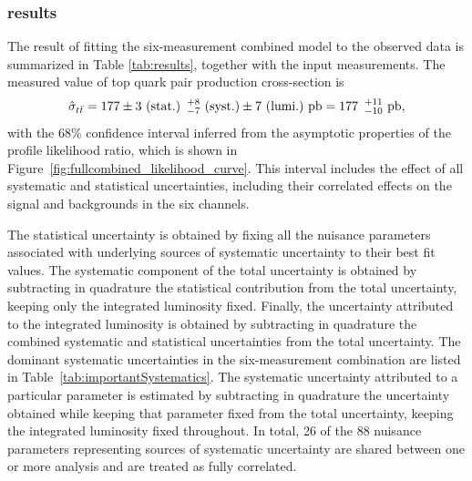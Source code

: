 

\subsubsection{results}
\label{sec:results}

The result of fitting the six-measurement combined model to the observed data is summarized in Table \ref{tab:results}, 
together with the input measurements.
The measured value of top quark pair production cross-section is
\begin{equation}
\hat\sigma_{t\bar{t}} =  177 \pm 3~\textrm{(stat.)} \hspace{ 5 pt } {}^{+8}_{-7}~\textrm{(syst.)} \pm 7~\textrm{(lumi.)}~\textrm{pb} = 177 \hspace{ 5 pt } {}^{+11}_{-10}~\textrm{pb}, \nonumber
\end{equation}
with the 68\% confidence interval inferred from the asymptotic properties of the profile likelihood ratio, which is shown in Figure~\ref{fig:fullcombined_likelihood_curve}.  
This interval includes the effect of all systematic and statistical uncertainties, including their correlated effects on the signal and backgrounds in the six channels.  

The statistical uncertainty is obtained by fixing all the nuisance parameters associated with underlying sources of systematic uncertainty to their best fit values.  
The systematic component of the total uncertainty is obtained by subtracting in quadrature the statistical contribution from the total uncertainty, keeping only the integrated luminosity fixed.
Finally, the uncertainty attributed to the integrated luminosity is obtained by subtracting in quadrature the combined systematic and statistical uncertainties from the total uncertainty.
The dominant systematic uncertainties in the six-measurement combination are listed in Table~\ref{tab:importantSystematics}. 
The systematic uncertainty attributed to a particular parameter is estimated by subtracting in quadrature the uncertainty obtained
while keeping that parameter fixed from the total uncertainty, keeping the integrated luminosity fixed throughout.
In total, 26 of the 88 nuisance parameters representing sources of systematic uncertainty are shared between one or more analysis and are treated as fully correlated.

